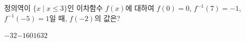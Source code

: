 \hspace*{2mm}\begin{minipage}[t]{\dimexpr\linewidth-2mm\relax}\vspace{0pt}
정의역이 $\{x \mid x\le 3\}$인 이차함수 $f(x)$에 대하여 $f(0)=0$, $f^{-1}(7)=-1$, $f^{-1}(-5)=1$일 때, $f(-2)$의 값은?
\begin{choices32}{$-32$}{$-16$}{$0$}{$16$}{$32$}\end{choices32}\end{minipage}
